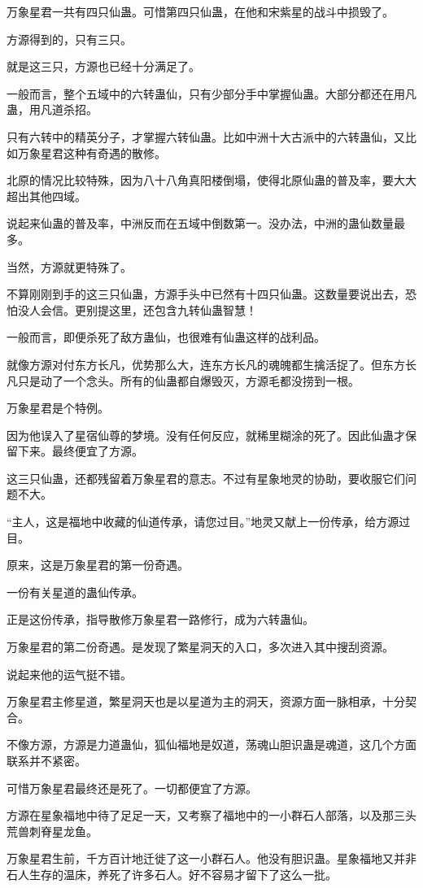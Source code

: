 \begin{this_body}
万象星君一共有四只仙蛊。可惜第四只仙蛊，在他和宋紫星的战斗中损毁了。

方源得到的，只有三只。

就是这三只，方源也已经十分满足了。

一般而言，整个五域中的六转蛊仙，只有少部分手中掌握仙蛊。大部分都还在用凡蛊，用凡道杀招。

只有六转中的精英分子，才掌握六转仙蛊。比如中洲十大古派中的六转蛊仙，又比如万象星君这种有奇遇的散修。

北原的情况比较特殊，因为八十八角真阳楼倒塌，使得北原仙蛊的普及率，要大大超出其他四域。

说起来仙蛊的普及率，中洲反而在五域中倒数第一。没办法，中洲的蛊仙数量最多。

当然，方源就更特殊了。

不算刚刚到手的这三只仙蛊，方源手头中已然有十四只仙蛊。这数量要说出去，恐怕没人会信。更别提这里，还包含九转仙蛊智慧！

一般而言，即便杀死了敌方蛊仙，也很难有仙蛊这样的战利品。

就像方源对付东方长凡，优势那么大，连东方长凡的魂魄都生擒活捉了。但东方长凡只是动了一个念头。所有的仙蛊都自爆毁灭，方源毛都没捞到一根。

万象星君是个特例。

因为他误入了星宿仙尊的梦境。没有任何反应，就稀里糊涂的死了。因此仙蛊才保留下来。最终便宜了方源。

这三只仙蛊，还都残留着万象星君的意志。不过有星象地灵的协助，要收服它们问题不大。

“主人，这是福地中收藏的仙道传承，请您过目。”地灵又献上一份传承，给方源过目。

原来，这是万象星君的第一份奇遇。

一份有关星道的蛊仙传承。

正是这份传承，指导散修万象星君一路修行，成为六转蛊仙。

万象星君的第二份奇遇。是发现了繁星洞天的入口，多次进入其中搜刮资源。

说起来他的运气挺不错。

万象星君主修星道，繁星洞天也是以星道为主的洞天，资源方面一脉相承，十分契合。

不像方源，方源是力道蛊仙，狐仙福地是奴道，荡魂山胆识蛊是魂道，这几个方面联系并不紧密。

可惜万象星君最终还是死了。一切都便宜了方源。

方源在星象福地中待了足足一天，又考察了福地中的一小群石人部落，以及那三头荒兽刺脊星龙鱼。

万象星君生前，千方百计地迁徙了这一小群石人。他没有胆识蛊。星象福地又并非石人生存的温床，养死了许多石人。好不容易才留下了这么一批。


\end{this_body}
